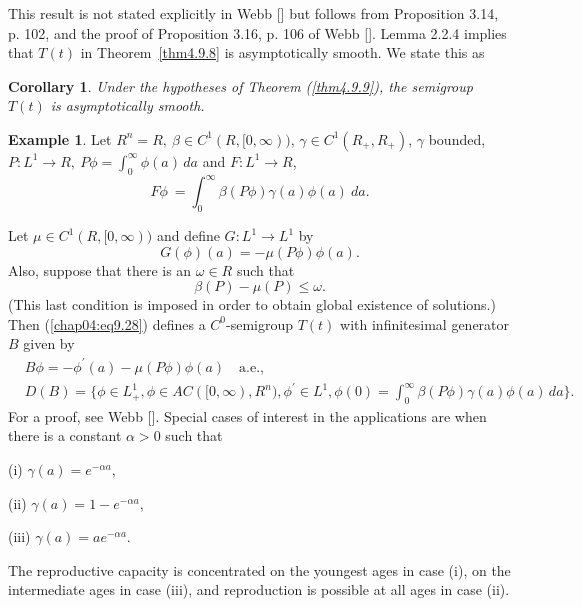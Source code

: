 \documentclass{surv-l}
\theoremstyle{plain}
\newtheorem{corollary}[theorem]{Corollary}
\theoremstyle{definition}
\newtheorem{exam}[theorem]{Example}
\numberwithin{equation}{section}
\numberwithin{figure}{chapter}
\begin{document}
This result is not stated explicitly in Webb [\citeyear{1985w}] but follows from Proposition 3.14, p. 102, and the proof of Proposition 3.16, p. 106 of Webb [\citeyear{1985w}]. Lemma 2.2.4 implies that $T(t)$ in Theorem~\ref{thm4.9.8} is asymptotically smooth. We state this as

\begin{corollary}\label{cor4.9.10} Under the hypotheses of Theorem \emph{(\ref{thm4.9.9})}, the semigroup $T(t)$ is asymptotically smooth.
\end{corollary}

\begin{exam}\label{exam4.9.11} Let $R^{n}=R,\ \beta\in C^{1}(R, [0, \infty))$, $\gamma\in C^{1}(R_{+}, R_{+})$, $\gamma$ bounded, $P: L^{1}\rightarrow R,\ P\phi=\int_{0}^{\infty}\phi(a)\, da$ and $F: L^{1}\rightarrow R$,
\begin{equation}\label{chap04:eq9.38}
 F\phi\ = \int_{0}^{\infty}\beta(P\phi)\gamma(a)\phi(a)\ da.
\end{equation}

Let $\mu\in C^{1}(R, [0, \infty))$ and define $G: L^{1}\rightarrow L^{1}$ by
\begin{equation}\label{chap04:eq9.39}
G(\phi)(a)=-\mu(P\phi)\phi(a).
\end{equation}
Also, suppose that there is an $\omega \in R$ such that
\begin{equation}\label{chap04:eq9.40}
\beta(P)-\mu(P)\leq\omega.
\end{equation}
(This last condition is imposed in order to obtain global existence of solutions.) Then (\ref{chap04:eq9.28}) defines a $C^{0}$-semigroup $T(t)$ with infinitesimal generator $B$ given by
\begin{equation}\label{chap04:eq9.41}
\begin{split}
& B\phi =-\phi^{\prime}(a)-\mu(P\phi)\phi(a)\quad \mathrm{a.e.},\\
& D(B)=\{\phi\in L_{+}^{1}, \phi\in AC([0, \infty), R^{n}), \phi^{\prime}\in L^{1}, \phi(0)=\int_{0}^{\infty}\beta(P\phi)\gamma(a)\phi(a)\,da\}.
\end{split}
\end{equation}
For a proof, see Webb [\citeyear{1985w}]. Special cases of interest in the applications are when there is a constant $\alpha>0$ such that

(i) $\gamma(a)=e^{-\alpha a}$,

(ii) $\gamma(a)=1-e^{-\alpha a}$,

(iii) $\gamma(a)=ae^{-\alpha a}$.

\noindent The reproductive capacity is concentrated on the youngest ages in case (i), on the intermediate ages in case (iii), and reproduction is possible at all ages in case (ii).
\end{exam}
\end{document}
